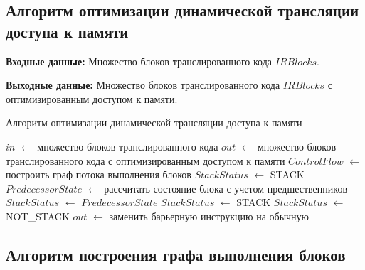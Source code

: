 \begin{comment}
{
	+  int State = NOT_CHANGED;
	+  std::set<OrderedNode*> StackNodes;
	+  std::set<OrderedNode*> UnStackNodes;
	+  std::vector<OrderedNode*> Predecessors;
	+  // std::vector<OrderedNode*> Successors;
	+  bool Visited = false;
	+};
+
\end{comment}

\subsection{Алгоритм оптимизации динамической трансляции доступа к памяти}

\textbf{Входные данные:} Множество блоков транслированного кода $IRBlocks$.

\textbf{Выходные данные:} Множество блоков транслированного кода $IRBlocks$ с оптимизированным доступом к памяти.

\begin{algorithm}[H]
\small
	\caption{Алгоритм оптимизации динамической трансляции доступа к памяти}
	\label{alg:memopt}
	\begin{algorithmic}[1]
		\State $in$ $\gets$ множество блоков транслированного кода
		\State $out$ $\gets$ множество блоков транслированного кода с оптимизированным доступом к памяти
		\State $ControlFlow$ $\gets$ построить граф потока выполнения блоков
		\State $StackStatus$ $\gets$ STACK
		\State $PredecessorState$ $\gets$ рассчитать состояние блока с учетом предшественников
		\State $StackStatus$ $\gets$ $PredecessorState$
		\EndIf
		\EndFor
		\State $StackStatus$ $\gets$ STACK
		\EndIf
		\State $StackStatus$ $\gets$ NOT\_STACK
		\EndIf
		\State $out$ $\gets$ заменить барьерную инструкцию на обычную
		\EndIf
		\EndFor
		\EndFor
	\end{algorithmic}
\end{algorithm}


\subsection{Алгоритм построения графа выполнения блоков}

